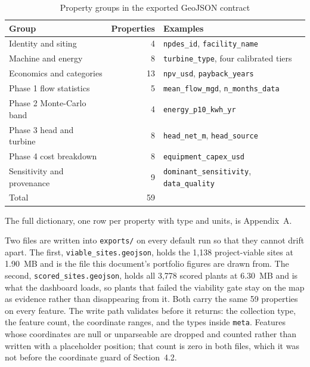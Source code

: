 \documentclass[12pt,letterpaper]{report}
\begin{document}
\begin{table}[htbp]
\centering
\caption{Property groups in the exported GeoJSON contract}
\label{tab:geojson_props}
\footnotesize
\begin{tabular}{@{}lrl@{}}
\toprule
Group & Properties & Examples \\
\midrule
Identity and siting        & 4  & \texttt{npdes\_id}, \texttt{facility\_name} \\
Machine and energy         & 8  & \texttt{turbine\_type}, four calibrated tiers \\
Economics and categories   & 13 & \texttt{npv\_usd}, \texttt{payback\_years} \\
Phase 1 flow statistics    & 5  & \texttt{mean\_flow\_mgd}, \texttt{n\_months\_data} \\
Phase 2 Monte-Carlo band   & 4  & \texttt{energy\_p10\_kwh\_yr} \\
Phase 3 head and turbine   & 8  & \texttt{head\_net\_m}, \texttt{head\_source} \\
Phase 4 cost breakdown     & 8  & \texttt{equipment\_capex\_usd} \\
Sensitivity and provenance & 9  & \texttt{dominant\_sensitivity}, \texttt{data\_quality} \\
\midrule
Total                      & 59 & \\
\bottomrule
\end{tabular}

\vspace{0.4em}
{\footnotesize The full dictionary, one row per property with type and units, is
Appendix~A.}
\end{table}

Two files are written into \texttt{exports/} on every default run so that they
cannot drift apart. The first, \texttt{viable\_sites.geojson}, holds the
1{,}138 project-viable sites at 1.90~MB and is the file this document's portfolio
figures are drawn from. The second, \texttt{scored\_sites.geojson}, holds all
3{,}778 scored plants at 6.30~MB
and is what the dashboard loads, so plants that failed the viability gate stay on
the map as evidence rather than disappearing from it. Both carry the same 59
properties on every feature. The write path validates before it returns: the
collection type, the feature count, the coordinate ranges, and the types inside
\texttt{meta}. Features whose coordinates are null or unparseable are dropped and
counted rather than written with a placeholder position; that count is zero in
both files, which it was not before the coordinate guard of Section~4.2.
\end{document}
